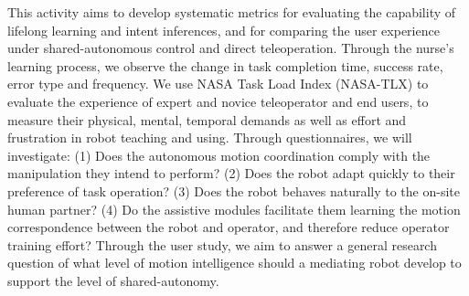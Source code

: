 \documentclass[letterpaper, 11 pt, onecolumn]{article}
\begin{document}
This activity aims to develop systematic metrics for evaluating the capability of lifelong learning and intent inferences, and for comparing the user experience under shared-autonomous control and direct teleoperation. Through the nurse's learning process, we observe the change in task completion time, success rate, error type and frequency. We use NASA Task Load Index (NASA-TLX) to evaluate the experience of expert and novice teleoperator and end users, to measure their physical, mental, temporal demands as well as effort and frustration in robot teaching and using. Through questionnaires, we will investigate: (1) Does the autonomous motion coordination comply with the manipulation they intend to perform? (2) Does the robot adapt quickly to their preference of task operation? (3) Does the robot behaves naturally to the on-site human partner? (4) Do the assistive modules facilitate them learning the motion correspondence between the robot and operator, and therefore reduce operator training effort? Through the user study, we aim to answer a general research question of what level of motion intelligence should a mediating robot develop to support the level of shared-autonomy. 




\end{document}
